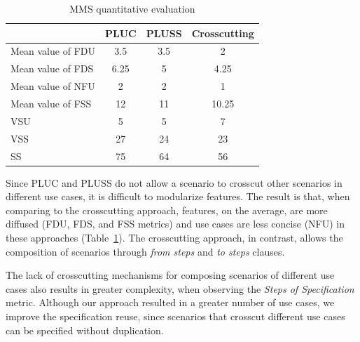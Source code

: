 \documentclass[11pt]{report}
\begin{document}
\begin{table}[htb]
\centering
 \caption{MMS quantitative evaluation}
\label{tab:metrics}
\begin{small}
\begin{tabular}{lccc} \hline
					& PLUC 	& PLUSS 	& Crosscutting	\\ \hline
Mean value of FDU 		& 3.5	& 3.5	& 2		\\
Mean value of FDS 		& 6.25	& 5		& 4.25	\\
Mean value of NFU 		& 2		& 2		& 1		\\
Mean value of FSS 		&12		& 11		& 10.25	\\ 
VSU 					& 5		& 5		& 7		\\
VSS 					& 27		& 24		& 23		\\
SS 					& 75		& 64		& 56		\\	\hline
\end{tabular}
\end{small}
\end{table}

Since PLUC and PLUSS do not allow a
scenario to crosscut other scenarios in different use cases, it
is difficult to modularize features. The
result is that, when comparing to the crosscutting approach,
features, on the average,  are more 
diffused (FDU, FDS, and FSS metrics) and use cases are
less concise (NFU) in these approaches (Table~\ref{tab:metrics}). The crosscutting
approach, in contrast, allows the composition of scenarios
through \emph{from steps} and \emph{to steps} clauses. 

The lack of crosscutting mechanisms for composing scenarios of different use cases also results in greater complexity, when observing the \emph{Steps of Specification} metric. Although our approach resulted in a greater number of use cases, we improve the specification reuse, since scenarios that crosscut different use cases can be specified without duplication. 

\end{document}
